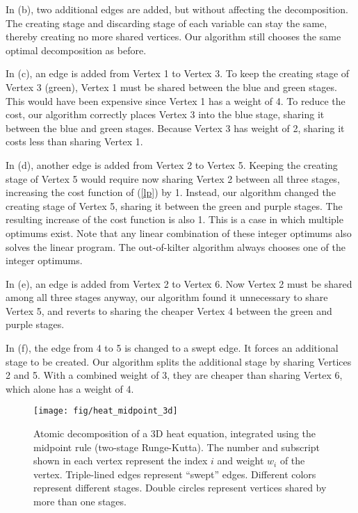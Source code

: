 \documentclass[review]{siamart0216}
\begin{document}
In (b), two additional edges are added, but without affecting the
decomposition.  The creating stage and discarding stage of each variable
can stay the same, thereby creating no more shared vertices.
Our algorithm still chooses the same optimal decomposition
as before.

In (c), an edge is added from Vertex 1 to Vertex 3.  To keep the creating stage
of Vertex 3 (green), Vertex 1 must be shared between the blue and green stages.
This would have been expensive since Vertex 1 has a weight of 4.  To reduce
the cost, our algorithm correctly places Vertex 3 into the blue stage, sharing
it between the blue and green stages.  Because Vertex 3 has weight of 2,
sharing it costs less than sharing Vertex 1.

In (d), another edge is added from Vertex 2 to Vertex 5.  Keeping the creating
stage of Vertex 5 would require now sharing Vertex 2 between all three stages,
increasing the cost function of (\ref{lp}) by 1.  Instead, our algorithm
changed the creating stage of Vertex 5, sharing it between the green and
purple stages.  The resulting increase of the cost function is also 1.  This
is a case in which multiple optimums exist.
Note that any linear combination of these integer optimums also solves
the linear program.  The out-of-kilter algorithm always chooses one of
the integer optimums.

In (e), an edge is added from Vertex 2 to Vertex 6.  Now Vertex 2 must be
shared among all three stages anyway, our algorithm found it unnecessary to
share Vertex 5, and reverts to sharing the cheaper Vertex 4 between the green
and purple stages.

In (f), the edge from 4 to 5 is changed to a swept edge.  It forces an
additional stage to be created.  Our algorithm splits the additional stage
by sharing Vertices 2 and 5.
With a combined weight of 3, they are cheaper than sharing Vertex 6,
which alone has a weight of 4.

\begin{figure}[htb!] \centering
    \texttt{[image: fig/heat\_midpoint\_3d]}
    \caption{Atomic decomposition of a 3D heat equation, integrated using
    the midpoint rule (two-stage Runge-Kutta).
    The number and subscript shown in each vertex represent the index $i$
    and weight $w_i$ of the vertex.  Triple-lined edges represent ``swept''
    edges.  Different colors represent different stages.  Double circles
    represent vertices shared by more than one stages.}
    \label{f:heat3d}
\end{figure}
\end{document}
